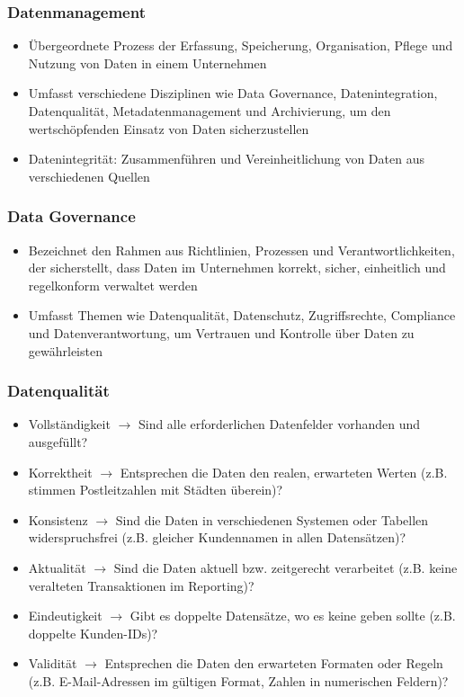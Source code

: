 \documentclass[11pt]{scrartcl}
\begin{document}
\subsubsection*{Datenmanagement}
\begin{itemize}
	\item Übergeordnete Prozess der Erfassung, Speicherung, Organisation, Pflege und Nutzung von Daten in einem Unternehmen
	\item Umfasst verschiedene Disziplinen wie Data Governance, Datenintegration, Datenqualität, Metadatenmanagement und Archivierung, um den wertschöpfenden Einsatz von Daten sicherzustellen
	\item Datenintegrität: Zusammenführen und Vereinheitlichung von Daten aus verschiedenen Quellen 
\end{itemize}

\subsubsection*{Data Governance}
\begin{itemize}
	\item Bezeichnet den Rahmen aus Richtlinien, Prozessen und Verantwortlichkeiten, der sicherstellt, dass Daten im Unternehmen korrekt, sicher, einheitlich und regelkonform verwaltet werden
	\item Umfasst Themen wie Datenqualität, Datenschutz, Zugriffsrechte, Compliance und Datenverantwortung, um Vertrauen und Kontrolle über Daten zu gewährleisten
\end{itemize}


\subsubsection*{Datenqualität}
\begin{itemize}
	\item Vollständigkeit $ \to $ Sind alle erforderlichen Datenfelder vorhanden und ausgefüllt?
	\item Korrektheit $ \to $ Entsprechen die Daten den realen, erwarteten Werten (z.B. stimmen Postleitzahlen mit Städten überein)?
	\item Konsistenz $ \to $ Sind die Daten in verschiedenen Systemen oder Tabellen widerspruchsfrei (z.B. gleicher Kundennamen in allen Datensätzen)?
	\item Aktualität $ \to $ Sind die Daten aktuell bzw. zeitgerecht verarbeitet (z.B. keine veralteten Transaktionen im Reporting)?
	\item Eindeutigkeit $ \to $ Gibt es doppelte Datensätze, wo es keine geben sollte (z.B. doppelte Kunden-IDs)?
	\item Validität $ \to $ Entsprechen die Daten den erwarteten Formaten oder Regeln (z.B. E-Mail-Adressen im gültigen Format, Zahlen in numerischen Feldern)?
\end{itemize}
\end{document}
